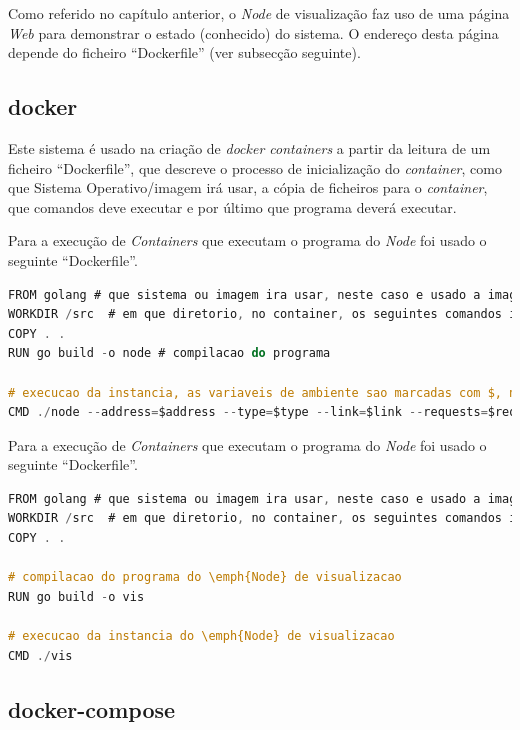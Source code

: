 Como referido no capítulo anterior, o \emph{Node} de visualização faz uso de uma página \emph{Web} para demonstrar o estado (conhecido) do sistema. O endereço desta página depende do ficheiro ``Dockerfile'' (ver subsecção seguinte).


\subsection*{docker}
Este sistema é usado na criação de \emph{docker containers} a partir da leitura de um ficheiro ``Dockerfile'', que descreve o processo de inicialização do \emph{container}, como que Sistema Operativo/imagem irá usar, a cópia de ficheiros para o \emph{container}, que comandos deve executar e por último que programa deverá executar.


Para a execução de \emph{Containers} que executam o programa do \emph{Node} foi usado o seguinte ``Dockerfile''.
\begin{lstlisting}[caption={``Dockerfile'' do \emph{Node}},language=C]
FROM golang # que sistema ou imagem ira usar, neste caso e usado a imagem ``golang''
WORKDIR /src  # em que diretorio, no container, os seguintes comandos irao ser executados
COPY . .
RUN go build -o node # compilacao do programa

# execucao da instancia, as variaveis de ambiente sao marcadas com $, no entanto serao descritas a sua origem de seguida
CMD ./node --address=$address --type=$type --link=$link --requests=$requests --visualization=$VIS_ADDRESS
\end{lstlisting}
 
Para a execução de \emph{Containers} que executam o programa do \emph{Node} foi usado o seguinte ``Dockerfile''.
\begin{lstlisting}[caption={``Dockerfile'' do \emph{Node}},language=C]
FROM golang # que sistema ou imagem ira usar, neste caso e usado a imagem ``golang''
WORKDIR /src  # em que diretorio, no container, os seguintes comandos irao ser executados
COPY . .

# compilacao do programa do \emph{Node} de visualizacao
RUN go build -o vis

# execucao da instancia do \emph{Node} de visualizacao
CMD ./vis

\end{lstlisting}

\subsection*{docker-compose}

